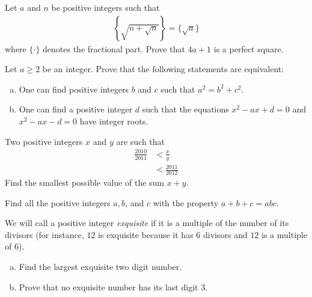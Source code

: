 \begin{problem}
	Let $a$ and $n$ be positive integers such that
	\begin{align*}
		\left\{ \sqrt{n + \sqrt{n}}\right\} = \big\{\sqrt a\big\}
	\end{align*}
	where $\{ \cdot \}$ denotes the fractional part. Prove that $4a+1$ is a perfect square.
\end{problem}

\begin{problem}
	Let $a \geq 2$ be an integer. Prove that the following statements are equivalent:
	\begin{enumerate}[(a)]
		\item One can find positive integers $b$ and $c$ such that $a^2 = b^2 + c^2$.
		\item One can find a positive integer $d$ such that the equations $x^2 - ax + d = 0$ and $x^2 - ax - d = 0$ have integer roots.
	\end{enumerate}
\end{problem}

\begin{problem}
	Two positive integers $x$ and $y$ are such that
	\begin{align*}
		\frac{2010}{2011}
			& < \frac{x}{y}\\
			& < \frac{2011}{2012}
	\end{align*}
	Find the smallest possible value of the sum $x + y$.
\end{problem}

\begin{problem}
	Find all the positive integers $a, b$, and $c$ with the property $a + b + c = abc$.
\end{problem}

\begin{problem}
	We will call a positive integer \textit{exquisite} if it is a multiple of the number of its divisors (for instance, $12$ is exquisite because it has $6$ divisors and $12$ is a multiple	of $6$).
	\begin{enumerate}[(a)]
		\item Find the largest exquisite two digit number.
		\item Prove that no exquisite number has its last digit $3$.
	\end{enumerate}
\end{problem}

